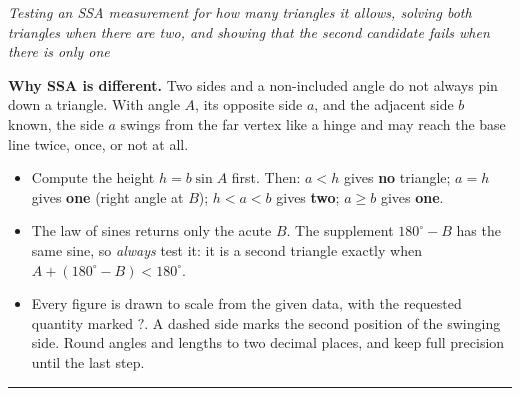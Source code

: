 \documentclass[12pt]{article}
\begin{document}


\begin{center}\small\textit{Testing an SSA measurement for how many triangles it
allows, solving both triangles when there are two, and showing that the second
candidate fails when there is only one}\end{center}

\noindent\textbf{Why SSA is different.} Two sides and a non-included angle do
not always pin down a triangle. With angle $A$, its opposite side $a$, and the
adjacent side $b$ known, the side $a$ swings from the far vertex like a hinge and
may reach the base line twice, once, or not at all.
\begin{itemize}[leftmargin=0.9cm, itemsep=0pt, topsep=2pt]
  \item Compute the height $h = b\sin A$ first. Then:
        $a < h$ gives \textbf{no} triangle; $a = h$ gives \textbf{one} (right
        angle at $B$); $h < a < b$ gives \textbf{two}; $a \ge b$ gives
        \textbf{one}.
  \item The law of sines returns only the acute $B$. The supplement
        $180^\circ - B$ has the same sine, so \emph{always} test it: it is a
        second triangle exactly when $A + (180^\circ - B) < 180^\circ$.
  \item Every figure is drawn to scale from the given data, with the requested
        quantity marked $?$. A dashed side marks the second position of the
        swinging side. Round angles and lengths to two decimal places, and keep
        full precision until the last step.
\end{itemize}
\noindent\rule{\linewidth}{0.4pt}


\end{document}
